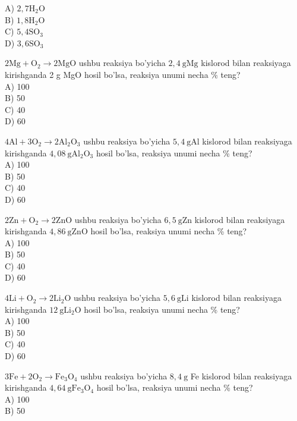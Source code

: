 A) $2,7 \mathrm{H}_{2} \mathrm{O}$\\
B) $1,8 \mathrm{H}_{2} \mathrm{O}$\\
C) $5,4 \mathrm{SO}_{3}$\\
D) $3,6 \mathrm{SO}_{3}$
  \item $2 \mathrm{Mg}+\mathrm{O}_{2} \rightarrow 2 \mathrm{MgO}$ ushbu reaksiya bo'yicha $2,4 \mathrm{~g} \mathrm{Mg}$ kislorod bilan reaksiyaga kirishganda 2 g MgO hosil bo'lsa, reaksiya unumi necha \% teng?\\
A) 100\\
B) 50\\
C) 40\\
D) 60\\
  \item $4 \mathrm{Al}+3 \mathrm{O}_{2} \rightarrow 2 \mathrm{Al}_{2} \mathrm{O}_{3}$ ushbu reaksiya bo'yicha $5,4 \mathrm{~g} \mathrm{Al}$ kislorod bilan reaksiyaga kirishganda $4,08 \mathrm{~g} \mathrm{Al}_{2} \mathrm{O}_{3}$ hosil bo'lsa, reaksiya unumi necha \% teng?\\
A) 100\\
B) 50\\
C) 40\\
D) 60
  \item $2 \mathrm{Zn}+\mathrm{O}_{2} \rightarrow 2 \mathrm{ZnO}$ ushbu reaksiya bo'yicha $6,5 \mathrm{~g} \mathrm{Zn}$ kislorod bilan reaksiyaga kirishganda $4,86 \mathrm{~g} \mathrm{ZnO}$ hosil bo'lsa, reaksiya unumi necha \% teng?\\
A) 100\\
B) 50\\
C) 40\\
D) 60
  \item $4 \mathrm{Li}+\mathrm{O}_{2} \rightarrow 2 \mathrm{Li}_{2} \mathrm{O}$ ushbu reaksiya bo'yicha $5,6 \mathrm{~g} \mathrm{Li}$ kislorod bilan reaksiyaga kirishganda $12 \mathrm{~g} \mathrm{Li}_{2} \mathrm{O}$ hosil bo'lsa, reaksiya unumi necha \% teng?\\
A) 100\\
B) 50\\
C) 40\\
D) 60
  \item $3 \mathrm{Fe}+2 \mathrm{O}_{2} \rightarrow \mathrm{Fe}_{3} \mathrm{O}_{4}$ ushbu reaksiya bo'yicha $8,4 \mathrm{~g}$ Fe kislorod bilan reaksiyaga kirishganda $4,64 \mathrm{~g} \mathrm{Fe}_{3} \mathrm{O}_{4}$ hosil bo'lsa, reaksiya unumi necha \% teng?\\
A) 100\\
B) 50\\
